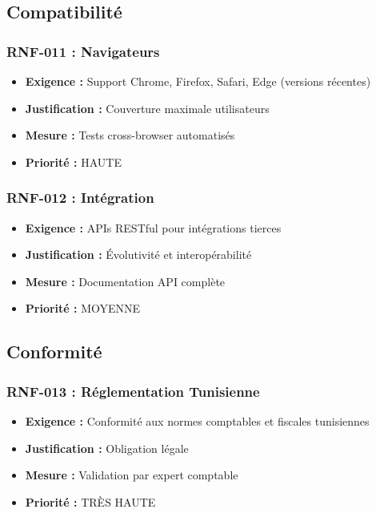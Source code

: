 \subsection{Compatibilité}

\subsubsection{RNF-011 : Navigateurs}
\begin{itemize}
    \item \textbf{Exigence :} Support Chrome, Firefox, Safari, Edge (versions récentes)
    \item \textbf{Justification :} Couverture maximale utilisateurs
    \item \textbf{Mesure :} Tests cross-browser automatisés
    \item \textbf{Priorité :} HAUTE
\end{itemize}

\subsubsection{RNF-012 : Intégration}
\begin{itemize}
    \item \textbf{Exigence :} APIs RESTful pour intégrations tierces
    \item \textbf{Justification :} Évolutivité et interopérabilité
    \item \textbf{Mesure :} Documentation API complète
    \item \textbf{Priorité :} MOYENNE
\end{itemize}

\subsection{Conformité}

\subsubsection{RNF-013 : Réglementation Tunisienne}
\begin{itemize}
    \item \textbf{Exigence :} Conformité aux normes comptables et fiscales tunisiennes
    \item \textbf{Justification :} Obligation légale
    \item \textbf{Mesure :} Validation par expert comptable
    \item \textbf{Priorité :} TRÈS HAUTE
\end{itemize}

